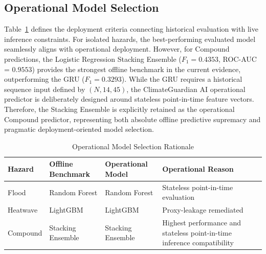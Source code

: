 \subsection{Operational Model Selection}
Table~\ref{tab:op_selection} defines the deployment criteria connecting historical evaluation with live inference constraints. For isolated hazards, the best-performing evaluated model seamlessly aligns with operational deployment. However, for Compound predictions, the Logistic Regression Stacking Ensemble ($F_1 = 0.4353$, ROC-AUC = $0.9553$) provides the strongest offline benchmark in the current evidence, outperforming the GRU ($F_1 = 0.3293$). While the GRU requires a historical sequence input defined by $(N, 14, 45)$, the ClimateGuardian AI operational predictor is deliberately designed around stateless point-in-time feature vectors. Therefore, the Stacking Ensemble is explicitly retained as the operational Compound predictor, representing both absolute offline predictive supremacy and pragmatic deployment-oriented model selection.

\begin{table}[htbp]
\caption{Operational Model Selection Rationale}
\begin{center}
\begin{tabular}{p{1.3cm} p{2.2cm} p{1.6cm} p{2.4cm}}
\toprule
\textbf{Hazard} & \textbf{Offline Benchmark} & \textbf{Operational Model} & \textbf{Operational Reason} \\
\midrule
Flood & Random Forest & Random Forest & Stateless point-in-time evaluation \\
Heatwave & LightGBM & LightGBM & Proxy-leakage remediated \\
Compound & Stacking Ensemble & Stacking Ensemble & Highest performance and stateless point-in-time inference compatibility \\
\bottomrule
\end{tabular}
\label{tab:op_selection}
\end{center}
\end{table}
